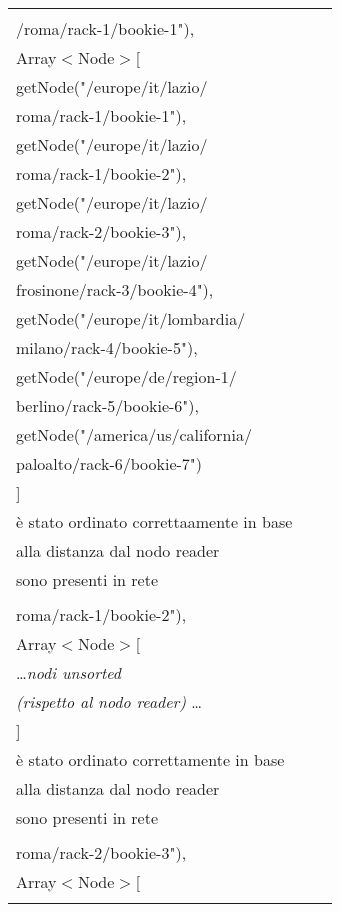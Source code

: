 \documentclass[10pt, a4paper]{article}
\newcommand{\Intmaketable}[4]{
	\begin{longtable}{#3}
	#4
	\caption{#2}
	\label{#1}
	\end{longtable}
}
\newcommand{\Inttestctable}[3]{
	\Intmaketable{#1}{#2}{|l|l|l|}{
	\hline
	\thead{Input} & \thead{Esito atteso} & \thead{Motivazione}\\
	\hline
	\hline
	#3
	\hline}
}
\newcommand{\Inttestccaption}[4]{Casi di test per metodo #1 di #2, iter. #3 (#4)}
\newcommand{\gettablelabel}[5]{table:#1:#2:#3:iter#4:proj#5}
\newcommand{\testctable}[5]{
	\Inttestctable{\gettablelabel{testc}{#1}{#2}{#3}{#4}}
		{\Inttestccaption{#1}{#2}{#3}{#4}}
		{#5}
}
\newcommand{\tcell}{\makecell[tl]}
\newcommand{\newtrow}{\\ \hline}
\def\bookkeeper{BookKeeper}
\begin{document}
	\pagebreak
	
	\testctable{pseudoSortByDistance}{NetworkTopologyImpl}{2}{\bookkeeper}{
			\tcell{getNode("/europe/it/lazio\\/roma/rack-1/bookie-1"),\\
				Array$<$Node$>$[\\
					\;\;getNode("/europe/it/lazio/\\roma/rack-1/bookie-1"),\\
					\;\;getNode("/europe/it/lazio/\\roma/rack-1/bookie-2"),\\
					\;\;getNode("/europe/it/lazio/\\roma/rack-2/bookie-3"),\\
					\;\;getNode("/europe/it/lazio/\\frosinone/rack-3/bookie-4"),\\
					\;\;getNode("/europe/it/lombardia/\\milano/rack-4/bookie-5"),\\
					\;\;getNode("/europe/de/region-1/\\berlino/rack-5/bookie-6"),\\
					\;\;getNode("/america/us/california/\\paloalto/rack-6/bookie-7")
					\\]} &
			\tcell{L'array passato (by reference) \\
			è stato ordinato correttaamente in base\\
			 alla distanza dal nodo reader} &
			\tcell{Tutti i nodi (reader e nell'array)\\ sono presenti in rete}
		\newtrow
			\tcell{getNode("/europe/it/lazio/\\roma/rack-1/bookie-2"),\\
				Array$<$Node$>$[\\
					\;\;\dots \textit{nodi unsorted} \\ \textit{(rispetto al nodo reader)}
					\dots \\
				]} &
			\tcell{L'array passato (by reference) \\
			è stato ordinato correttamente in base\\
			alla distanza dal nodo reader} &
			\tcell{Tutti i nodi (reader e nell'array)\\ sono presenti in rete}
		\newtrow
			\tcell{getNode("/europe/it/lazio/\\roma/rack-2/bookie-3"),\\
				Array$<$Node$>$[\\
}}
\end{document}

